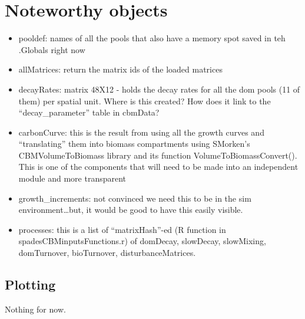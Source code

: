 \documentclass[]{article}
\newenvironment{Shaded}{\begin{snugshade}}{\end{snugshade}}
\newcommand{\KeywordTok}[1]{\textcolor[rgb]{0.13,0.29,0.53}{\textbf{#1}}}
\newcommand{\DataTypeTok}[1]{\textcolor[rgb]{0.13,0.29,0.53}{#1}}
\newcommand{\StringTok}[1]{\textcolor[rgb]{0.31,0.60,0.02}{#1}}
\newcommand{\OtherTok}[1]{\textcolor[rgb]{0.56,0.35,0.01}{#1}}
\newcommand{\NormalTok}[1]{#1}
\providecommand{\tightlist}{%
  \setlength{\itemsep}{0pt}\setlength{\parskip}{0pt}}
\begin{document}
\begin{Shaded}
\begin{Highlighting}[]
{\NormalTok{spadesCBMSim <-}\StringTok{ }\KeywordTok{simInit}\NormalTok{(}\DataTypeTok{times =}\NormalTok{ times, }\DataTypeTok{params =}\NormalTok{ parameters, }
                    \DataTypeTok{modules =}\NormalTok{ modules,}
                 \DataTypeTok{objects =}\NormalTok{ objects, }\DataTypeTok{paths =}\NormalTok{ paths)}

\NormalTok{spadesCBMout <-}\StringTok{ }\KeywordTok{spades}\NormalTok{(spadesCBMSim,}\DataTypeTok{debug=}\OtherTok{TRUE}\NormalTok{)}
\end{Highlighting}
\end{Shaded}

\section{Noteworthy objects}\label{noteworthy-objects}

\begin{itemize}
\tightlist
\item
  pooldef: names of all the pools that also have a memory spot saved in
  teh .Globals right now
\item
  allMatrices: return the matrix ids of the loaded matrices
\item
  decayRates: matrix 48X12 - holds the decay rates for all the dom pools
  (11 of them) per spatial unit. Where is this created? How does it link
  to the ``decay\_parameter'' table in cbmData?
\item
  carbonCurve: this is the result from using all the growth curves and
  ``translating'' them into biomass compartments using SMorken's
  CBMVolumeToBiomass library and its function VolumeToBiomassConvert().
  This is one of the components that will need to be made into an
  independent module and more transparent
\item
  growth\_increments: not convinced we need this to be in the sim
  environment\ldots{}but, it would be good to have this easily visible.
\item
  processes: this is a list of ``matrixHash''-ed (R function in
  spadesCBMinputsFunctions.r) of domDecay, slowDecay, slowMixing,
  domTurnover, bioTurnover, disturbanceMatrices.
\end{itemize}

\subsection{Plotting}\label{plotting}

Nothing for now.
\end{document}
